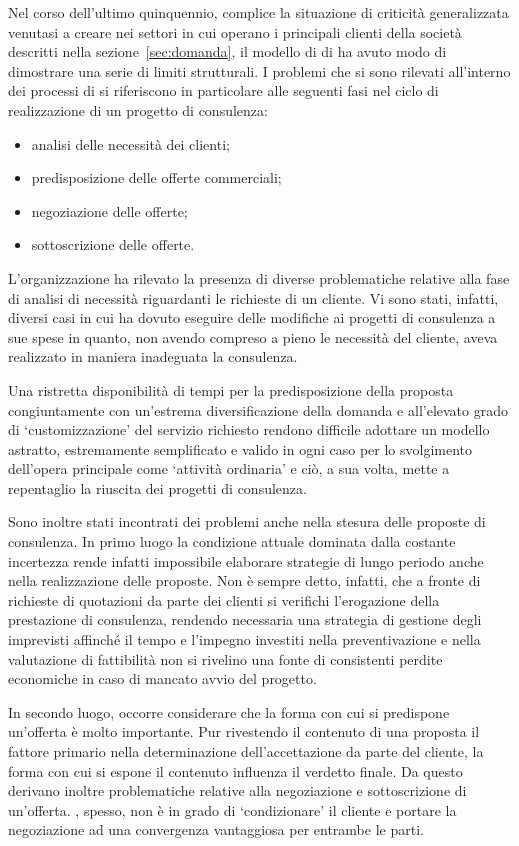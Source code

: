 Nel corso dell'ultimo quinquennio, complice la situazione di criticità generalizzata venutasi a creare nei settori in cui operano i principali clienti della società descritti nella sezione~\ref{sec:domanda}, il modello di \bsn di \customer ha avuto modo di dimostrare una serie di limiti strutturali. I problemi che si sono rilevati all'interno dei processi di \customer si riferiscono in particolare alle seguenti fasi nel ciclo di realizzazione di un progetto di consulenza:
\begin{itemize}
	\item analisi delle necessità dei clienti;
	\item predisposizione delle offerte commerciali;
	\item negoziazione delle offerte;
	\item sottoscrizione delle offerte.
\end{itemize}
  
L'organizzazione ha rilevato la presenza di diverse problematiche relative alla fase di analisi di necessità riguardanti le richieste di un cliente. Vi sono stati, infatti, diversi casi in cui \customer  ha dovuto eseguire delle modifiche ai progetti di consulenza a sue spese in quanto, non avendo compreso a pieno le necessità del cliente, aveva realizzato in maniera inadeguata la consulenza.

Una ristretta disponibilità di tempi per la predisposizione della proposta congiuntamente con un'estrema diversificazione della domanda e all'elevato grado di `customizzazione' del servizio richiesto rendono difficile adottare un modello astratto, estremamente semplificato e valido in ogni caso per lo svolgimento dell'opera principale come `attività ordinaria' e ciò, a sua volta, mette a repentaglio la riuscita dei progetti di consulenza.

Sono inoltre stati incontrati dei problemi anche nella stesura delle proposte di consulenza. In primo luogo la condizione attuale dominata dalla costante incertezza rende infatti impossibile elaborare strategie di lungo periodo anche nella realizzazione delle proposte. Non è sempre detto, infatti, che a fronte di richieste di quotazioni da parte dei clienti si verifichi l'erogazione della prestazione di consulenza, rendendo necessaria una strategia di gestione degli imprevisti affinché il tempo e l'impegno investiti nella preventivazione e nella valutazione di fattibilità non si rivelino una fonte di consistenti perdite economiche in caso di mancato avvio del progetto.

In secondo luogo, occorre considerare che la forma con cui si predispone un'offerta è molto importante. Pur rivestendo il contenuto di una proposta il fattore primario nella determinazione dell'accettazione da parte del cliente, la forma con cui si espone il contenuto influenza il verdetto finale. Da questo derivano inoltre problematiche relative alla negoziazione e sottoscrizione di un'offerta. \customer, spesso, non è in grado di `condizionare' il cliente e portare la negoziazione ad una convergenza vantaggiosa per entrambe le parti.


